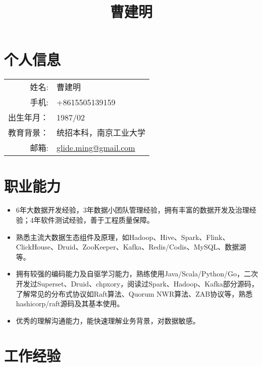 \documentclass{ctexart}
\author{}
\title{\vspace{-1cm}曹建明}
\date{}
\begin{document}


\section*{个人信息}

\noindent\begin{tabular}{rl}
姓名: & 曹建明\\
手机: & +8615505139159\\
出生年月：& 1987/02\\
教育背景：& 统招本科，南京工业大学\\
邮箱: & \href{mailto:glide.ming@gmail.com}{glide.ming@gmail.com}
\end{tabular}

\section*{职业能力}

\begin{itemize}
\item 6年大数据开发经验，3年数据小团队管理经验，拥有丰富的数据开发及治理经验；4年软件测试经验，善于工程质量保障。
\item 熟悉主流大数据生态组件及原理，如Hadoop、Hive、Spark、Flink、ClickHouse、Druid、ZooKeeper、Kafka、Redis/Codis、MySQL、数据湖	等。
\item 拥有较强的编码能力及自驱学习能力，熟练使用Java/Scala/Python/Go，二次开发过Superset、Druid、chpxory，阅读过Spark、Hadoop、Kafka部分源码，了解常见的分布式协议如Raft算法、Quorum NWR算法、ZAB协议等，熟悉hashicorp/raft源码及其基本使用。
\item 优秀的理解沟通能力，能快速理解业务背景，对数据敏感。
\end{itemize}

\section*{工作经验}
\end{document}
